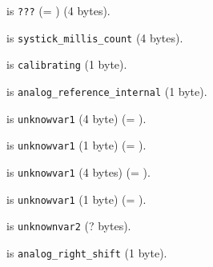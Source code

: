  is \texttt{???} (= ) (4 bytes).

 is \texttt{systick\_millis\_count} (4 bytes).

 is \texttt{calibrating} (1 byte).

 is \texttt{analog\_reference\_internal} (1 byte).

 is \texttt{unknowvar1} (4 byte) (= ).

 is \texttt{unknowvar1} (1 byte) (= ).

 is \texttt{unknowvar1} (4 bytes) (= ).

 is \texttt{unknowvar1} (1 byte) (= ).

 is \texttt{unknownvar2} (? bytes).

 is \texttt{analog\_right\_shift} (1 byte).
